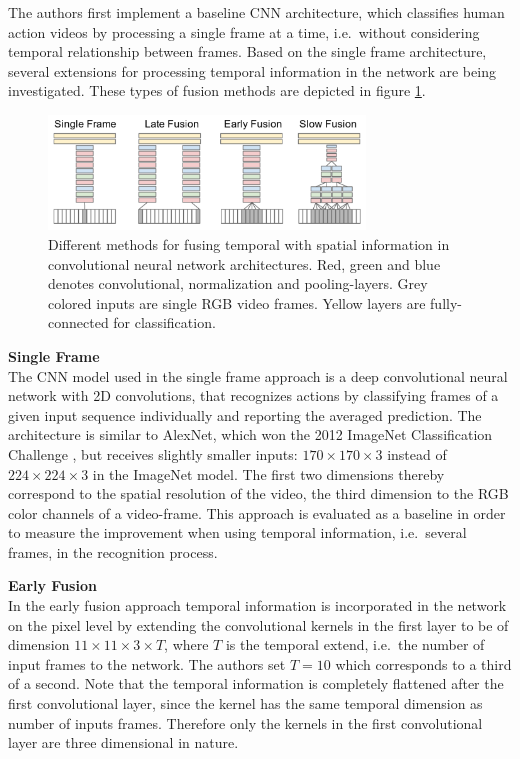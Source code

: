The authors first implement a baseline CNN architecture, which classifies human action videos by processing a single frame at a time, i.e.\ without considering temporal relationship between frames.
Based on the single frame architecture, several extensions for processing temporal information in the network are being investigated. These types of fusion methods are depicted in figure \ref{fig:largescale_fusionmethods}.

\begin{figure}[H]
    \centering
    \includegraphics[width=0.75\textwidth]{img_deep/largescale_fusionmethods}
    \caption{Different methods for fusing temporal with spatial information in convolutional neural network architectures. Red, green and blue denotes convolutional, normalization and pooling-layers. Grey colored inputs are single RGB video frames. Yellow layers are fully-connected for classification. \cite{karpathy_large-scale_2014}}
    \label{fig:largescale_fusionmethods}
\end{figure}

\textbf{Single Frame}\\
The CNN model used in the single frame approach is a deep convolutional neural network with 2D convolutions, that recognizes actions by classifying frames of a given input sequence individually and reporting the averaged prediction.
The architecture is similar to AlexNet, which won the 2012 ImageNet Classification Challenge \cite{krizhevsky_imagenet_2012-1}, but receives slightly smaller inputs: $170\times170\times3$ instead of $224\times224\times3$ in the ImageNet model.
The first two dimensions thereby correspond to the spatial resolution of the video, the third dimension to the RGB color channels of a video-frame.
This approach is evaluated as a baseline in order to measure the improvement when using temporal information, i.e.\ several frames, in the recognition process. 

\textbf{Early Fusion}\\
In the early fusion approach temporal information is incorporated in the network on the pixel level by extending the convolutional kernels in the first layer to be of dimension $11 \times 11 \times 3 \times T$, where $T$ is the temporal extend, i.e.\ the number of input frames to the network.
The authors set $T = 10$ which corresponds to a third of a second.
Note that the temporal information is completely flattened after the first convolutional layer, since the kernel has the same temporal dimension as number of inputs frames.
Therefore only the kernels in the first convolutional layer are three dimensional in nature.

